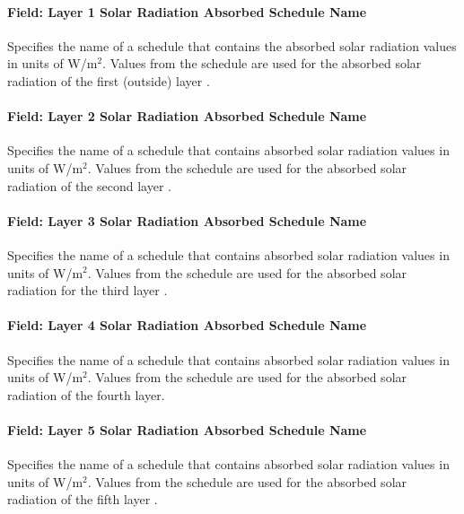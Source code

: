 \paragraph{Field: Layer 1 Solar Radiation Absorbed Schedule Name}\label{field-layer-1-solar-radiation-absorbed-schedule-name}

Specifies the name of a schedule that contains the absorbed solar radiation values in units of W/m\(^{2}\). Values from the schedule are used for the absorbed solar radiation of the first (outside) layer .

\paragraph{Field: Layer 2 Solar Radiation Absorbed Schedule Name}\label{field-layer-2-solar-radiation-absorbed-schedule-name}

Specifies the name of a schedule that contains absorbed solar radiation values in units of W/m\(^{2}\). Values from the schedule are used for the absorbed solar radiation of the second layer .

\paragraph{Field: Layer 3 Solar Radiation Absorbed Schedule Name}\label{field-layer-3-solar-radiation-absorbed-schedule-name}

Specifies the name of a schedule that contains absorbed solar radiation values in units of W/m\(^{2}\). Values from the schedule are used for the absorbed solar radiation for the third layer .

\paragraph{Field: Layer 4 Solar Radiation Absorbed Schedule Name}\label{field-layer-4-solar-radiation-absorbed-schedule-name}

Specifies the name of a schedule that contains absorbed solar radiation values in units of W/m\(^{2}\). Values from the schedule are used for the absorbed solar radiation of the fourth layer.

\paragraph{Field: Layer 5 Solar Radiation Absorbed Schedule Name}\label{field-layer-5-solar-radiation-absorbed-schedule-name}

Specifies the name of a schedule that contains absorbed solar radiation values in units of W/m\(^{2}\). Values from the schedule are used for the absorbed solar radiation of the fifth layer .

